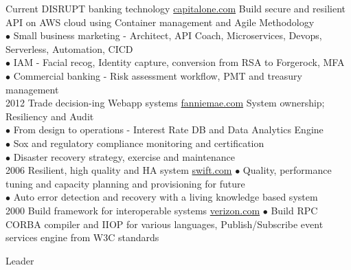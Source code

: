 \documentclass[]{friggeri-cv}
\begin{document}
\begin{entrylist}
  \entry
    {Current}
    {DISRUPT banking technology}
    {\href{http://www.capitalone.com}{capitalone.com}}
    {Build secure and resilient API on AWS cloud using Container management and Agile Methodology\\
    $\bullet$ Small business marketing - Architect, API Coach, Microservices, Devops, Serverless, Automation, CICD \\
    $\bullet$ IAM - Facial recog, Identity capture, conversion from RSA to Forgerock, MFA\\
    $\bullet$ Commercial banking - Risk assessment workflow, PMT and treasury management \\} 
  \entry
    {2012}
    {Trade decision-ing Webapp systems}
    {\href{http://www.fanniemae.com}{fanniemae.com}}
    {System ownership; Resiliency and Audit\\
    $\bullet$ From design to operations - Interest Rate DB and Data Analytics Engine \\
    $\bullet$ Sox and regulatory compliance monitoring and certification\\
    $\bullet$ Disaster recovery strategy, exercise and maintenance\\}
  \entry
    {2006}
    {Resilient, high quality and HA system}
    {\href{http://www.swift.com}{swift.com}}
    {$\bullet$ Quality, performance tuning and capacity planning and provisioning for future\\
     $\bullet$ Auto error detection and recovery with a living knowledge based system\\}
  \entry
    {2000}
    {Build framework for interoperable systems}
    {\href{http://www.verizon.com}{verizon.com}}
    {$\bullet$ Build RPC CORBA compiler and IIOP for various languages, Publish/Subscribe event services engine from W3C standards\\}
\end{entrylist}

\newpage
{}
      {Leader}

\end{document}
